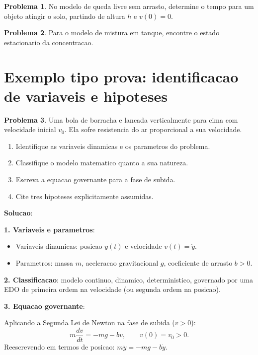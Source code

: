 \documentclass[12pt,a4paper,oneside]{book}
\theoremstyle{definition}
\newtheorem{problem}{Problema}
\begin{document}
\begin{problem}
No modelo de queda livre sem arrasto, determine o tempo para um objeto atingir o solo, partindo de altura $h$ e $v(0)=0$.
\end{problem}

\begin{problem}
Para o modelo de mistura em tanque, encontre o estado estacionario da concentracao.
\end{problem}

\section{Exemplo tipo prova: identificacao de variaveis e hipoteses}

\begin{problem}
Uma bola de borracha e lancada verticalmente para cima com velocidade inicial $v_0$.
Ela sofre resistencia do ar proporcional a sua velocidade.
\begin{enumerate}
    \item Identifique as variaveis dinamicas e os parametros do problema.
    \item Classifique o modelo matematico quanto a sua natureza.
    \item Escreva a equacao governante para a fase de subida.
    \item Cite tres hipoteses explicitamente assumidas.
\end{enumerate}
\end{problem}

\textbf{Solucao}:

\textbf{1. Variaveis e parametros}:
\begin{itemize}
    \item Variaveis dinamicas: posicao $y(t)$ e velocidade $v(t) = \dot{y}$.
    \item Parametros: massa $m$, aceleracao gravitacional $g$, coeficiente de arrasto $b>0$.
\end{itemize}

\textbf{2. Classificacao}: modelo continuo, dinamico, deterministico, governado por uma
EDO de primeira ordem na velocidade (ou segunda ordem na posicao).

\textbf{3. Equacao governante}:

Aplicando a Segunda Lei de Newton na fase de subida ($v>0$):
\begin{equation}
m\frac{dv}{dt} = -mg - bv, \qquad v(0) = v_0 > 0.
\end{equation}
Reescrevendo em termos de posicao: $m\ddot{y} = -mg - b\dot{y}$.
\end{document}
